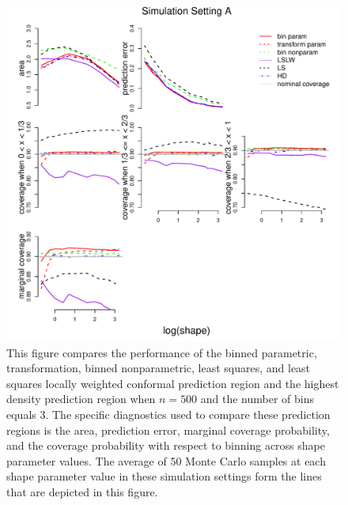 \documentclass[11pt]{article}\usepackage[]{graphicx}\usepackage[]{color}
\makeatletter
\def\maxwidth{ %
  \ifdim\Gin@nat@width>\linewidth
    \linewidth
  \else
    \Gin@nat@width
  \fi
}
\newenvironment{knitrout}{}{} %
\makeatother
\begin{document}
\newpage
\begin{figure}[h!]
\begin{center}
\begin{knitrout}
\color{fgcolor}
\includegraphics[width=\maxwidth]{figure/Fig-gamma-500-1} 

\end{knitrout}
\end{center}
\caption{This figure compares the performance of the 
  binned parametric,
  transformation,
  binned nonparametric,
  least squares, and 
  least squares locally weighted conformal prediction region and the 
  highest density prediction region when $n = 500$ and the number of bins 
  equals 3.  
  The specific diagnostics used to compare these prediction regions is the 
    area,
    prediction error, 
    marginal coverage probability,
    and the coverage probability with respect to binning 
    across shape parameter values.
  The average of 50 Monte Carlo samples at each shape parameter value in 
  these simulation settings form the lines that are depicted in this figure.}
\label{Fig:gamma.500}
\end{figure}
\end{document}
